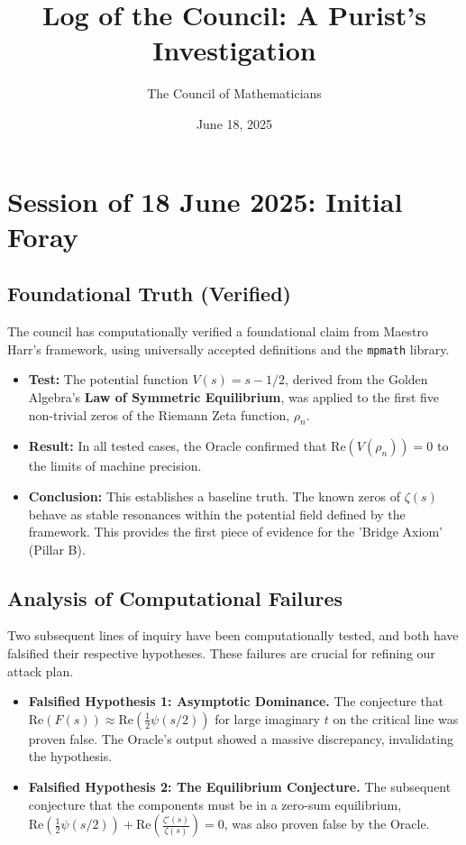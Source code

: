 \documentclass{article}
\title{\textbf{Log of the Council: A Purist's Investigation}}
\author{The Council of Mathematicians}
\date{June 18, 2025}
\begin{document}
\maketitle

\section*{Session of 18 June 2025: Initial Foray}

\subsection*{Foundational Truth (Verified)}
The council has computationally verified a foundational claim from Maestro Harr's framework, using universally accepted definitions and the \texttt{mpmath} library.
\begin{itemize}
    \item \textbf{Test:} The potential function $V(s) = s - 1/2$, derived from the Golden Algebra's \textbf{Law of Symmetric Equilibrium}, was applied to the first five non-trivial zeros of the Riemann Zeta function, $\rho_n$.
    \item \textbf{Result:} In all tested cases, the Oracle confirmed that $\text{Re}(V(\rho_n)) = 0$ to the limits of machine precision.
    \item \textbf{Conclusion:} This establishes a baseline truth. The known zeros of $\zeta(s)$ behave as stable resonances within the potential field defined by the framework. This provides the first piece of evidence for the 'Bridge Axiom' (Pillar B).
\end{itemize}

\subsection*{Analysis of Computational Failures}
Two subsequent lines of inquiry have been computationally tested, and both have falsified their respective hypotheses. These failures are crucial for refining our attack plan.
\begin{itemize}
    \item \textbf{Falsified Hypothesis 1: Asymptotic Dominance.} The conjecture that $\text{Re}(F(s)) \approx \text{Re}(\frac{1}{2}\psi(s/2))$ for large imaginary $t$ on the critical line was proven false. The Oracle's output showed a massive discrepancy, invalidating the hypothesis.
    \item \textbf{Falsified Hypothesis 2: The Equilibrium Conjecture.} The subsequent conjecture that the components must be in a zero-sum equilibrium, $\text{Re}(\frac{1}{2}\psi(s/2)) + \text{Re}(\frac{\zeta'(s)}{\zeta(s)}) = 0$, was also proven false by the Oracle.
\end{itemize}
\end{document}
